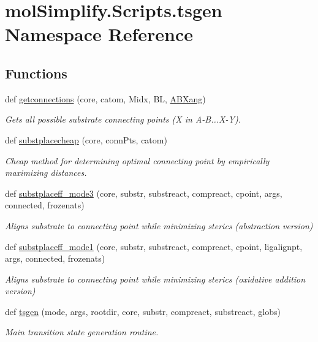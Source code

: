 \hypertarget{namespacemolSimplify_1_1Scripts_1_1tsgen}{}\section{mol\+Simplify.\+Scripts.\+tsgen Namespace Reference}
\label{namespacemolSimplify_1_1Scripts_1_1tsgen}
\subsection*{Functions}
\begin{DoxyCompactItemize}
\item 
def \hyperlink{namespacemolSimplify_1_1Scripts_1_1tsgen_a87681ac0a98980187ecb8cd451419539}{getconnections} (core, catom, Midx, BL, \hyperlink{namespacemolSimplify_1_1Scripts_1_1tsgen_a04e8e706dd6866bed934574a55c5960a}{A\+B\+Xang})
\begin{DoxyCompactList}\small\item\em Gets all possible substrate connecting points (X in A-\/B...X-\/Y). \end{DoxyCompactList}\item 
def \hyperlink{namespacemolSimplify_1_1Scripts_1_1tsgen_a88f6cac491a82d3c4d8ffc9bbbf81939}{substplacecheap} (core, conn\+Pts, catom)
\begin{DoxyCompactList}\small\item\em Cheap method for determining optimal connecting point by empirically maximizing distances. \end{DoxyCompactList}\item 
def \hyperlink{namespacemolSimplify_1_1Scripts_1_1tsgen_a21186624592614ad3b00554a54108dc0}{substplaceff\+\_\+mode3} (core, substr, substreact, compreact, cpoint, args, connected, frozenats)
\begin{DoxyCompactList}\small\item\em Aligns substrate to connecting point while minimizing sterics (abstraction version) \end{DoxyCompactList}\item 
def \hyperlink{namespacemolSimplify_1_1Scripts_1_1tsgen_a7cc357bc5c467116ebf134d0d726c5b5}{substplaceff\+\_\+mode1} (core, substr, substreact, compreact, cpoint, ligalignpt, args, connected, frozenats)
\begin{DoxyCompactList}\small\item\em Aligns substrate to connecting point while minimizing sterics (oxidative addition version) \end{DoxyCompactList}\item 
def \hyperlink{namespacemolSimplify_1_1Scripts_1_1tsgen_aeaa5828b747b01e0e202412dc79ebcce}{tsgen} (mode, args, rootdir, core, substr, compreact, substreact, globs)
\begin{DoxyCompactList}\small\item\em Main transition state generation routine. \end{DoxyCompactList}\end{DoxyCompactItemize}
